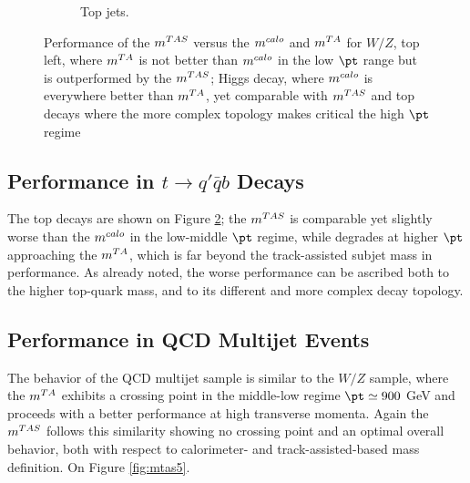 \begin{figure}
\begin{subfigure}[b]{0.45\textwidth}
  \caption[$\mtas$ for boosted tops]{Top jets.}
  \label{fig:mtas3}
    \end{subfigure}%


    \caption[Performance of the $\mtas$ versus the $\mcal$ and $\mta$]{Performance of the $\mtas$ versus the $\mcal$ and $\mta$ for $W/Z$, top left, where $\mta$ is not better than $\mcal$ in the low $\pt$ range but is outperformed by the $\mtas$;  Higgs decay, where $\mcal$ is everywhere better than $\mta$, yet comparable with $\mtas$ and top decays where the more complex topology makes critical the high $\pt$ regime} 
\end{figure}


\subsection{Performance in $t\to q'\bar{q}b$ Decays}
The top decays are shown on Figure \ref{fig:mtas3}; the $\mtas$ is comparable yet slightly worse than the $\mcal$ in the low-middle $\pt$ regime, while degrades at higher $\pt$ approaching the $\mta$, which is far beyond the track-assisted subjet mass in performance.
As already noted, the worse performance can be ascribed both to the higher top-quark mass, and to its different and more complex decay topology.








\subsection{Performance in QCD Multijet Events}
The behavior of the QCD multijet sample is similar to the $W/Z$ sample, where the $\mta$ exhibits a crossing point in the middle-low regime $\pt\simeq900$ GeV and proceeds with a better performance at high transverse momenta.
Again the $\mtas$ follows this similarity showing no crossing point and an optimal overall behavior, both with respect to calorimeter- and track-assisted-based mass definition. On Figure \ref{fig:mtas5}.

